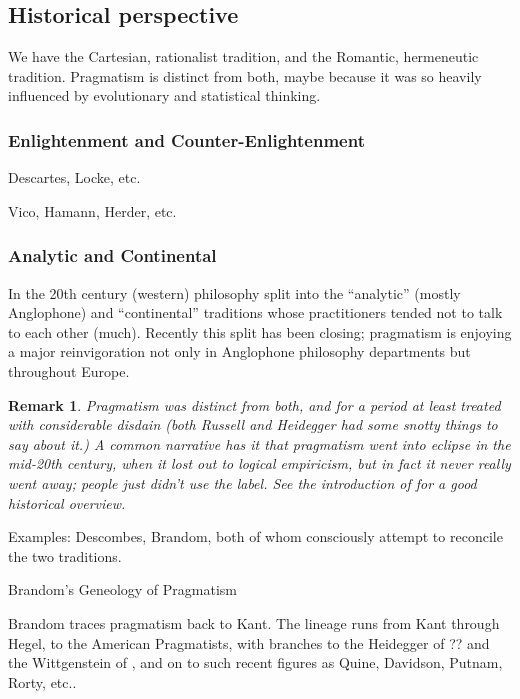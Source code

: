 \documentclass[11pt,twoside]{article}
\newtheorem{remark}{Remark}
\begin{document}
\subsection{Historical perspective}

We have the Cartesian, rationalist tradition, and the Romantic,
hermeneutic tradition.  Pragmatism is distinct from both, maybe
because it was so heavily influenced by evolutionary and statistical
thinking.

\subsubsection{Enlightenment and Counter-Enlightenment}

Descartes, Locke, etc.

Vico, Hamann, Herder, etc.

\subsubsection{Analytic and Continental}

In the 20th century (western) philosophy split into the ``analytic''
(mostly Anglophone) and ``continental'' traditions whose practitioners
tended not to talk to each other (much).  Recently this split has been
closing; pragmatism is enjoying a major reinvigoration not only in
Anglophone philosophy departments but throughout Europe.

\begin{remark}
  Pragmatism was distinct from both, and for a period at least treated
  with considerable disdain (both Russell and Heidegger had some
  snotty things to say about it.)  A common narrative has it that
  pragmatism went into eclipse in the mid-20th century, when it lost
  out to logical empiricism, but in fact it never really went away;
  people just didn't use the label.  See the introduction of
  \cite{bacon_pragmatism:_2012} for a good historical overview.
\end{remark}

Examples: Descombes, Brandom, both of whom consciously attempt to
reconcile the two traditions.


Brandom's Geneology of Pragmatism

Brandom traces pragmatism back to Kant.  The lineage runs from Kant
through Hegel, to the American Pragmatists, with branches to the
Heidegger of ?? and the Wittgenstein of
\cite*{wittgenstein_philosophical_2009}, and on to such recent figures
as Quine, Davidson, Putnam, Rorty, etc..
\end{document}
